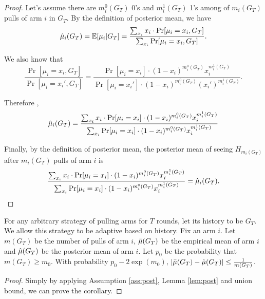 \begin{proof}
Let's assume there are $m^0_i(G_T)$ 0's and $m^1_i(G_T)$ 1's among of $m_i(G_T)$ pulls of arm $i$ in $G_T$. By the definition of posterior mean, we have
\[
\hat{\mu}_i(G_T) = \mathbb{E}[\mu_i|G_T] = \frac{\sum_{x_i} x_i \cdot \Pr[\mu_i=x_i, G_T]}{\sum_{x_i} \Pr[\mu_i=x_i, G_T]}.
\]

We also know that 
\[
\frac{\Pr[\mu_i = x_i, G_T]}{\Pr[\mu_i = x_i', G_T]} = \frac{\Pr[\mu_i = x_i] \cdot  (1-x_i)^{m^0_i(G_T)}x_i^{m^1_i(G_T)}}{\Pr[\mu_i = x_i'] \cdot (1-x_i)^{m^0_i(G_T)}(x_i')^{m^1_i(G_T)} }.
\]

Therefore ,
\[
\hat{\mu}_i(G_T) = \frac{\sum_{x_i} x_i \cdot \Pr[\mu_i = x_i] \cdot  (1-x_i)^{m^0_i(G_T)}x_i^{m^1_i(G_T)}}{\sum_{x_i}\Pr[\mu_i = x_i] \cdot  (1-x_i)^{m^0_i(G_T)}x_i^{m^1_i(G_T)}}
\]

Finally, by the definition of posterior mean, the posterior mean of seeing $H_{m_i(G_T)}$ after $m_i(G_T)$ pulls of arm $i$ is
\[
\frac{\sum_{x_i} x_i \cdot \Pr[\mu_i = x_i] \cdot  (1-x_i)^{m^0_i(G_T)}x_i^{m^1_i(G_T)}}{\sum_{x_i}\Pr[\mu_i = x_i] \cdot  (1-x_i)^{m^0_i(G_T)}x_i^{m^1_i(G_T)}} = \hat{\mu}_i(G_T).
\]
\end{proof}

\begin{corollary}
\label{cor:post}
For any arbitrary strategy of pulling arms for $T$ rounds, let its history to be $G_T$. We allow this strategy to be adaptive based on history. Fix an arm $i$. Let $m(G_T)$ be the number of pulls of arm $i$, $\bar{\mu}(G_T)$ be the empirical mean of arm $i$ and $\hat{\mu}(G_T)$ be the posterior mean of arm $i$. Let $p_0$ be the probability that $m(G_T) \geq m_0$. With probability $p_0 - 2\exp(m_0)$, $|\bar{\mu}(G_T) - \hat{\mu}(G_T)| \leq \frac{1}{m(G_T)}$.
\end{corollary}

\begin{proof}
Simply by applying Assumption \ref{ass:post}, Lemma \ref{lem:post} and union bound, we can prove the corollary.
\end{proof}
